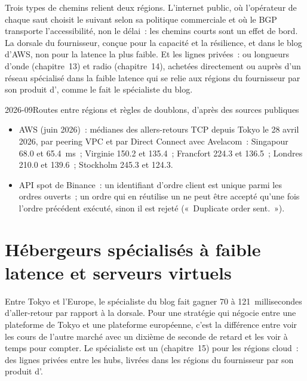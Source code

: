 Trois types de chemins relient deux régions. L'internet public, où l'opérateur de chaque saut choisit le suivant selon sa politique commerciale et où le BGP
transporte l'accessibilité, non le délai~: les chemins courts sont un effet de bord. La dorsale du fournisseur, conçue pour la capacité et la résilience, et
dans le blog d'AWS, non pour la latence la plus faible. Et les lignes privées~:  ou longueurs d'onde (chapitre~13) et radio (chapitre~14), achetées
directement ou auprès d'un réseau spécialisé dans la faible latence qui se relie aux régions du fournisseur par son produit d', comme le fait le spécialiste du blog.

\begin{dated}{2026-09}{Routes entre régions et règles de doublons, d'après des sources publiques}\label{dat:nw:cross-region-crypto-networks:routes}
\begin{itemize}
\item AWS (juin 2026)~: médianes des allers-retours TCP depuis Tokyo le 28 avril 2026, par peering VPC et par Direct Connect avec Avelacom~: Singapour 68.0 et
  65.4~ms~; Virginie 150.2 et 135.4~; Francfort 224.3 et 136.5~; Londres 210.0 et 139.6~; Stockholm 245.3 et 124.3.
\item API spot de Binance~: un identifiant d'ordre client est unique parmi les ordres ouverts~; un ordre qui en réutilise un ne peut être accepté qu'une fois
  l'ordre précédent exécuté, sinon il est rejeté («~Duplicate order sent.~»).
\end{itemize}
\end{dated}

\section{Hébergeurs spécialisés à faible latence et serveurs virtuels}

Entre Tokyo et l'Europe, le spécialiste du blog fait gagner 70 à 121~millisecondes d'aller-retour par rapport à la dorsale. Pour une stratégie qui négocie entre une
plateforme de Tokyo et une plateforme européenne, c'est la différence entre voir les cours de l'autre marché avec un dixième de seconde de retard et les voir à
temps pour compter. Le spécialiste est un  (chapitre~15) pour les régions cloud~: des lignes privées entre les hubs, livrées dans les
régions du fournisseur par son produit d'.

